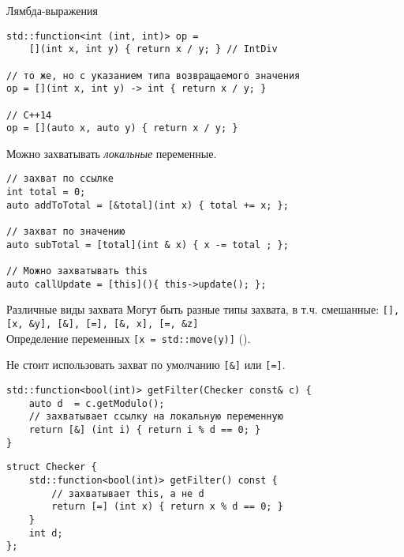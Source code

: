 \documentclass{beamer}
\begin{document}
\begin{frame}[fragile]{Лямбда-выражения}
\begin{lstlisting}
std::function<int (int, int)> op = 
    [](int x, int y) { return x / y; } // IntDiv

// то же, но с указанием типа возвращаемого значения
op = [](int x, int y) -> int { return x / y; }

// С++14
op = [](auto x, auto y) { return x / y; } 
\end{lstlisting}

Можно захватывать \emph{локальные} переменные.
\begin{lstlisting}
// захват по ссылке
int total = 0;
auto addToTotal = [&total](int x) { total += x; };

// захват по значению
auto subTotal = [total](int & x) { x -= total ; };

// Можно захватывать this
auto callUpdate = [this](){ this->update(); };
\end{lstlisting}
\end{frame}

\begin{frame}[fragile]{Различные виды захвата}
Могут быть разные типы захвата, в т.ч. смешанные: 
\verb![], [x, &y], [&], [=], [&, x], [=, &z]!\\
\medskip
Определение переменных \verb![x = std::move(y)]! (\langcpp[14]).
\medskip

Не стоит использовать захват по умолчанию \verb![&]! или \verb![=]!.
\begin{lstlisting}
std::function<bool(int)> getFilter(Checker const& c) {
    auto d  = c.getModulo();
    // захватывает ссылку на локальную переменную
    return [&] (int i) { return i % d == 0; }
}
\end{lstlisting}

\begin{lstlisting}
struct Checker {
    std::function<bool(int)> getFilter() const {
        // захватывает this, а не d
        return [=] (int x) { return x % d == 0; }
    }
    int d;
};
\end{lstlisting}
\end{frame}
\end{document}
